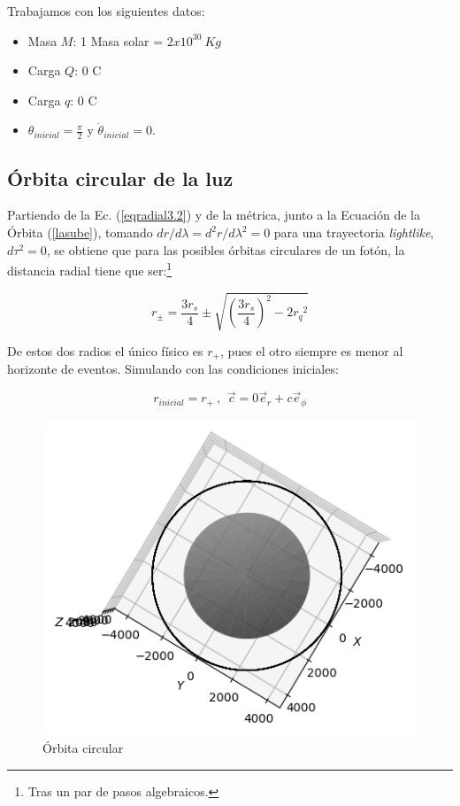 Trabajamos con los siguientes datos:

\begin{itemize}
    \item Masa $M$: 1 Masa solar = $2x10^{30}\ Kg$
    \item Carga $Q$: 0 C
    \item Carga $q$: 0 C
    \item $\theta_{inicial} = \frac{\pi}{2}$ y $\Dot{\theta}_{inicial}=0$.
\end{itemize}

\subsection*{\textbf{Órbita circular de la luz}}
Partiendo de la Ec. (\ref{eqradial3.2}) y de la métrica, junto a la Ecuación de la Órbita (\ref{lasube}), tomando $dr/d\lambda =d^2r/d\lambda^2 = 0$ para una trayectoria \textit{lightlike}, $d\tau^2=0$, se obtiene que para las posibles órbitas circulares de un fotón, la distancia radial tiene que ser:\footnote{Tras un par de pasos algebraicos.} 

\begin{equation}
    r_\pm = \frac{3 r_s}{4} \pm \sqrt{\left(\frac{3 r_s}{4}\right)^2 - 2 {r_q}^2}
\end{equation}

De estos dos radios el único físico es $r_+$, pues el otro siempre es menor al horizonte de eventos. Simulando con las condiciones iniciales:

\begin{equation}
    r_{inicial}=r_+\ \text{, }\ \Vec{c}= 0\Vec{e}_r + c\Vec{e}_{\phi}
\end{equation}

\begin{figure}[h!]
    \centering
    \includegraphics[width=.8\textwidth]{Im/luz_circular.png}
    \caption{Órbita circular}
\end{figure}

